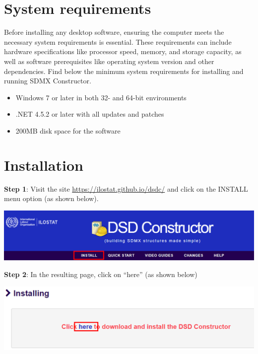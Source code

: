 \documentclass[
]{book}
\providecommand{\tightlist}{%
  \setlength{\itemsep}{0pt}\setlength{\parskip}{0pt}}
\begin{document}
\hypertarget{system-requirements}{%
\section{System requirements}\label{system-requirements}}

Before installing any desktop software, ensuring the computer meets the necessary system requirements is essential. These requirements can include hardware specifications like processor speed, memory, and storage capacity, as well as software prerequisites like operating system version and other dependencies. Find below the minimum system requirements for installing and running SDMX Constructor.

\begin{itemize}
\tightlist
\item
  Windows 7 or later in both 32- and 64-bit environments
\item
  .NET 4.5.2 or later with all updates and patches
\item
  200MB disk space for the software
\end{itemize}

\hypertarget{installation}{%
\section{Installation}\label{installation}}

\textbf{Step 1}: Visit the site \url{https://ilostat.github.io/dsdc/} and click on the INSTALL menu option (as shown below).

\begin{center}\includegraphics[width=1\linewidth]{./images/image003} \end{center}

\textbf{Step 2}: In the resulting page, click on ``here'' (as shown below)

\begin{center}\includegraphics[width=1\linewidth]{./images/image005} \end{center}
\end{document}
